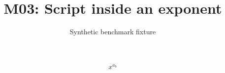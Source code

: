 \documentclass{article}
\title{M03: Script inside an exponent}
\author{Synthetic benchmark fixture}
\date{}
\begin{document}
\maketitle
\[x^{a_b}\]
\end{document}
